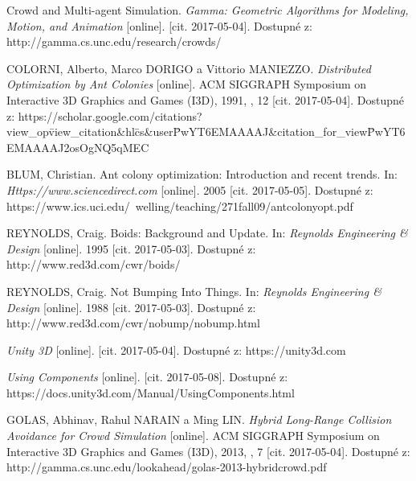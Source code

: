 \begin{thebibliography}{99}

Crowd and Multi-agent Simulation. \textit{Gamma: Geometric Algorithms for Modeling, Motion, and Animation} [online]. [cit. 2017-05-04]. Dostupné z: http://gamma.cs.unc.edu/research/crowds/

COLORNI, Alberto, Marco DORIGO a Vittorio MANIEZZO. \textit{Distributed Optimization by Ant Colonies} [online]. ACM SIGGRAPH Symposium on Interactive 3D Graphics and Games (I3D), 1991, , 12 [cit. 2017-05-04]. Dostupné z: https://scholar.google.com/citations?view\_op\=view\_citation\&hl\=cs\&user\=PwYT6EMAAAAJ\&citation\_for\_view\=PwYT6EMAAAAJ\:2osOgNQ5qMEC

BLUM, Christian. Ant colony optimization: Introduction and recent trends. In: \textit{Https://www.sciencedirect.com} [online]. 2005 [cit. 2017-05-05]. Dostupné z: https://www.ics.uci.edu/~welling/teaching/271fall09/antcolonyopt.pdf

REYNOLDS, Craig. Boids: Background and Update. In: \textit{Reynolds Engineering \& Design} [online]. 1995 [cit. 2017-05-03]. Dostupné z: http://www.red3d.com/cwr/boids/

REYNOLDS, Craig. Not Bumping Into Things. In: \textit{Reynolds Engineering \& Design} [online]. 1988 [cit. 2017-05-03]. Dostupné z: http://www.red3d.com/cwr/nobump/nobump.html

\textit{Unity 3D} [online]. [cit. 2017-05-04]. Dostupné z: https://unity3d.com

\textit{Using Components} [online]. [cit. 2017-05-08]. Dostupné z: https://docs.unity3d.com/Manual/UsingComponents.html

GOLAS, Abhinav, Rahul NARAIN a Ming LIN. \textit{Hybrid Long-Range Collision Avoidance for Crowd Simulation} [online]. ACM SIGGRAPH Symposium on Interactive 3D Graphics and Games (I3D), 2013, , 7 [cit. 2017-05-04]. Dostupné z: http://gamma.cs.unc.edu/lookahead/golas-2013-hybridcrowd.pdf

\end{thebibliography}